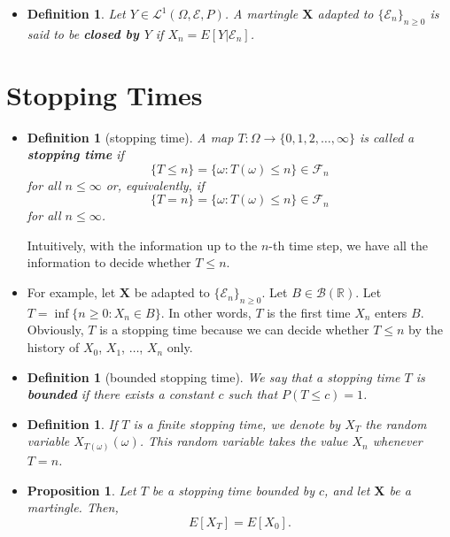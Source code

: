 \documentclass[10pt]{article}
\newtheorem{definition}[lemma]{Definition}
\newtheorem{proposition}[lemma]{Proposition}
\numberwithin{lemma}{section}
\newcommand{\ve}[1]{\mathbf{#1}}
\newcommand{\mcal}[1]{\mathcal{#1}}
\newcommand{\Real}{\mathbb{R}}
\begin{document}
\begin{itemize}
  \item \begin{definition}
    Let $Y \in \mcal{L}^1(\Omega,\mcal{E},P)$. A martingle $\ve{X}$ adapted to $\{ \mcal{E}_n \}_{n \geq 0}$ is said to be {\bf closed by $Y$}  if $X_n = E[Y|\mcal{E}_n]$.
  \end{definition}
\end{itemize}

\section{Stopping Times}

\begin{itemize}
  \item \begin{definition}[stopping time]
    A map $T: \Omega \rightarrow \{ 0, 1, 2, \dotsc, \infty \}$ is called a {\bf stopping time} if $$\{ T \leq n \} = \{ \omega: T(\omega) \leq n \} \in \mcal{F}_n$$ for all $n \leq \infty$ or, equivalently, if $$ \{ T = n \} = \{ \omega: T(\omega) \leq n \} \in \mcal{F}_n$$
    for all $n \leq \infty$.
  \end{definition}
  Intuitively, with the information up to the $n$-th time step, we have all the information to decide whether $T \leq n$.

  \item For example, let $\ve{X}$ be adapted to $\{ \mcal{E}_n \}_{n \geq 0}$. Let $B \in \mcal{B}(\Real)$. Let $T = \inf \{ n \geq 0: X_n \in B \}$. In other words, $T$ is the first time $X_n$ enters $B$. Obviously, $T$ is a stopping time because we can decide whether $T \leq n$ by the history of $X_0$, $X_1$, $\dotsc$, $X_n$ only.
  
  \item \begin{definition}[bounded stopping time]
    We say that a stopping time $T$ is {\bf bounded} if there exists a constant $c$ such that $P(T \leq c) = 1$.
  \end{definition}

  \item \begin{definition}
    If $T$ is a finite stopping time, we denote by $X_T$ the random variable $X_{T(\omega)}(\omega)$. This random variable takes the value $X_n$ whenever $T = n$.
  \end{definition}

  \item \begin{proposition}
    Let $T$ be a stopping time bounded by $c$, and let $\ve{X}$ be a martingle. Then, $$E[X_T] = E[X_0].$$
  \end{proposition}


\end{itemize}
\end{document}
